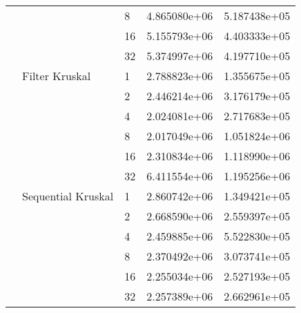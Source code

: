 \begin{tabular}{lllrr}
                       &                    & 8  &  4.865080e+06 &  5.187438e+05 \\
                       &                    & 16 &  5.155793e+06 &  4.403333e+05 \\
                       &                    & 32 &  5.374997e+06 &  4.197710e+05 \\
                       & Filter Kruskal & 1  &  2.788823e+06 &  1.355675e+05 \\
                       &                    & 2  &  2.446214e+06 &  3.176179e+05 \\
                       &                    & 4  &  2.024081e+06 &  2.717683e+05 \\
                       &                    & 8  &  2.017049e+06 &  1.051824e+06 \\
                       &                    & 16 &  2.310834e+06 &  1.118990e+06 \\
                       &                    & 32 &  6.411554e+06 &  1.195256e+06 \\
                       & Sequential Kruskal & 1  &  2.860742e+06 &  1.349421e+05 \\
                       &                    & 2  &  2.668590e+06 &  2.559397e+05 \\
                       &                    & 4  &  2.459885e+06 &  5.522830e+05 \\
                       &                    & 8  &  2.370492e+06 &  3.073741e+05 \\
                       &                    & 16 &  2.255034e+06 &  2.527193e+05 \\
                       &                    & 32 &  2.257389e+06 &  2.662961e+05 \\
\bottomrule
\end{tabular}

